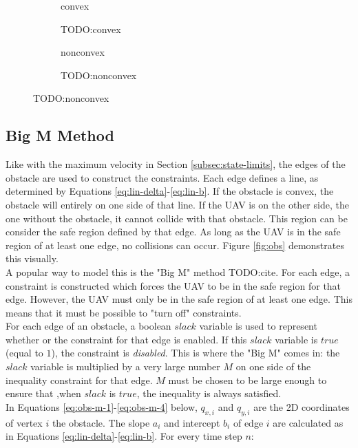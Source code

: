 \begin{figure}[]
    \centering
    
    \begin{subfigure}[]{0.47\textwidth}
        convex
        \caption{TODO:convex}
        \label{fig:convex-example}
    \end{subfigure}
    \hfil
    \begin{subfigure}[]{0.47\textwidth}
        nonconvex
        \caption{TODO:nonconvex}
        \label{fig:nonconvex-example}
    \end{subfigure}
\end{figure}


\subsection{Big M Method}
Like with the maximum velocity in Section \ref{subsec:state-limits}, the edges of the obstacle are used to construct the constraints. Each edge defines a line, as determined by Equations \ref{eq:lin-delta}-\ref{eq:lin-b}. If the obstacle is convex, the obstacle will entirely on one side of that line. If the UAV is on the other side, the one without the obstacle, it cannot collide with that obstacle. This region can be consider the safe region defined by that edge. As long as the UAV is in the safe region of at least one edge, no collisions can occur. Figure \ref{fig:obs} demonstrates this visually. \\
A popular way to model this is the "Big M" method TODO:cite. For each edge, a constraint is constructed which forces the UAV to be in the safe region for that edge. However, the UAV must only be in the safe region of at least one edge. This means that it must be possible to "turn off" constraints. \\
For each edge of an obstacle, a boolean $slack$ variable is used to represent whether or the constraint for that edge is enabled. If this $slack$ variable is $true$ (equal to $1$), the constraint is \emph{disabled}. This is where the "Big M" comes in: the $slack$ variable is multiplied by a very large number $M$ on one side of the inequality constraint for that edge. $M$ must be chosen to be large enough to ensure that ,when $slack$ is $true$, the inequality is always satisfied. \\
In Equations \ref{eq:obs-m-1}-\ref{eq:obs-m-4} below, $q_{x,i}$ and $q_{y,i}$ are the 2D coordinates of vertex $i$ the obstacle. The slope $a_{i}$ and intercept $b_{i}$ of edge $i$ are calculated as in Equations \ref{eq:lin-delta}-\ref{eq:lin-b}. For every time step $n$:
